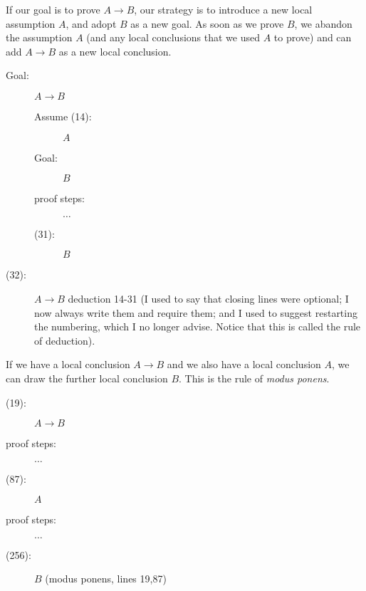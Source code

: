 \documentclass[12pt]{article}
\begin{document}
If our goal is to prove $A \rightarrow B$, our strategy is to introduce a
new local assumption $A$, and adopt $B$ as a new goal.  As soon as we
prove $B$, we abandon the assumption $A$ (and any local conclusions
that we used $A$ to prove) and can add $A \rightarrow B$ as a new
local conclusion.

\begin{description}

\item[Goal:]  $A \rightarrow B$

\begin{description}

\item[Assume (14):]  $A$

\item[Goal:]  $B$

\item[proof steps:]  $\ldots$

\item[(31):] $B$




\end{description}

\item[(32):]  $A \rightarrow B$  deduction 14-31  (I used to say that closing lines were optional;  I now always write them and require them;  and I used to suggest restarting
the numbering, which I no longer advise.  Notice that this is called the rule of deduction).

\end{description}

If we have a local conclusion $A \rightarrow B$ and we also have a
local conclusion $A$, we can draw the further local conclusion $B$.
This is the rule of {\em modus ponens\/}.

\newpage

\begin{description}
\item[(19):]  $A \rightarrow B$

\item[proof steps:]  $\ldots$

\item[(87):]  $A$

\item[proof steps:]  $\ldots$

\item [(256):]  $B$ (modus ponens, lines 19,87)


\end{description}
\end{document}
